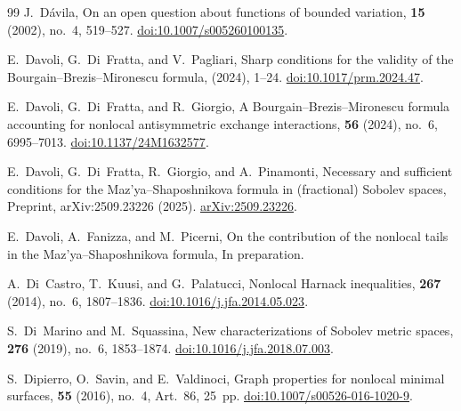 \documentclass[reqno,11pt]{amsart}
\numberwithin{equation}{section}
\theoremstyle{definition} %
\theoremstyle{plain}
\theoremstyle{definition}
\theoremstyle{remark}
\begin{document}
\begin{thebibliography}{99}
J.~D{\'a}vila,
\newblock On an open question about functions of bounded variation,
 \textbf{15} (2002), no.~4, 519--527.
\newblock \href{https://doi.org/10.1007/s005260100135}{doi:10.1007/s005260100135}.

E.~Davoli, G.~Di~Fratta, and V.~Pagliari,
\newblock Sharp conditions for the validity of the {B}ourgain--{B}rezis--{M}ironescu formula,
 (2024), 1--24.
\newblock \href{https://doi.org/10.1017/prm.2024.47}{doi:10.1017/prm.2024.47}.

E.~Davoli, G.~Di~Fratta, and R.~Giorgio,
\newblock A {B}ourgain--{B}rezis--{M}ironescu formula accounting for nonlocal antisymmetric exchange interactions,
 \textbf{56} (2024), no.~6, 6995--7013.
\newblock \href{https://doi.org/10.1137/24M1632577}{doi:10.1137/24M1632577}.

E.~Davoli, G.~Di~Fratta, R.~Giorgio, and A.~Pinamonti,
\newblock Necessary and sufficient conditions for the {M}az'ya--{S}haposhnikova formula in (fractional) {S}obolev spaces,
\newblock Preprint, arXiv:2509.23226 (2025).
\newblock \href{https://arxiv.org/abs/2509.23226}{arXiv:2509.23226}.

E.~Davoli, A.~Fanizza, and M.~Picerni,
\newblock On the contribution of the nonlocal tails in the {M}az'ya--{S}haposhnikova formula,
\newblock In preparation.

A.~Di~Castro, T.~Kuusi, and G.~Palatucci,
\newblock Nonlocal {H}arnack inequalities,
 \textbf{267} (2014), no.~6, 1807--1836.
\newblock \href{https://doi.org/10.1016/j.jfa.2014.05.023}{doi:10.1016/j.jfa.2014.05.023}.

S.~Di~Marino and M.~Squassina,
\newblock New characterizations of {S}obolev metric spaces,
 \textbf{276} (2019), no.~6, 1853--1874.
\newblock \href{https://doi.org/10.1016/j.jfa.2018.07.003}{doi:10.1016/j.jfa.2018.07.003}.

S.~Dipierro, O.~Savin, and E.~Valdinoci,
\newblock Graph properties for nonlocal minimal surfaces,
 \textbf{55} (2016), no.~4, Art.~86, 25~pp.
\newblock \href{https://doi.org/10.1007/s00526-016-1020-9}{doi:10.1007/s00526-016-1020-9}.


\end{thebibliography}
\end{document}
